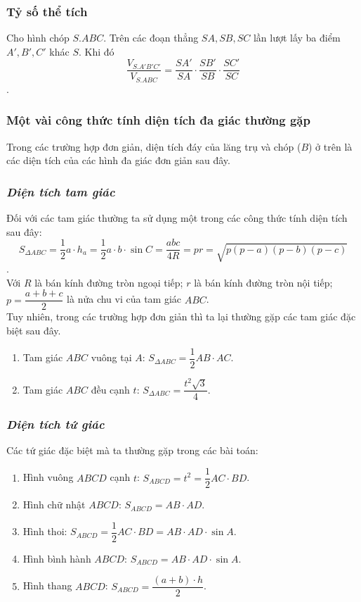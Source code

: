 \subsubsection{Tỷ số thể tích}
\begin{tc}
Cho hình chóp $S.ABC$. Trên các đoạn thẳng $SA, SB, SC$ lần lượt lấy ba điểm $A', B', C'$ khác $S$. Khi đó $$\dfrac{V_{S.A'B'C'}}{V_{S.ABC}}=\dfrac{SA'}{SA}\cdot\dfrac{SB'}{SB}\cdot\dfrac{SC'}{SC}$$.
\end{tc}
\subsubsection*{Một vài công thức tính diện tích đa giác thường gặp}
Trong các trường hợp đơn giản, diện tích đáy của lăng trụ và chóp ($B$) ở trên là các diện tích của các hình đa giác đơn giản sau đây.
\subsubsection*{\it Diện tích tam giác}
Đối với các tam giác thường ta sử dụng một trong các công thức tính diện tích sau đây:\\
$$S_{\Delta ABC} = \dfrac{1}{2} a\cdot h_a= \dfrac{1}{2}a\cdot b\cdot \sin C = \dfrac{abc}{4R}=pr = \sqrt{p(p-a)(p-b)(p-c)}$$.\\
Với $R$ là bán kính đường tròn ngoại tiếp; $r$ là bán kính đường tròn nội tiếp; $p= \dfrac{a+b+c}{2}$ là nửa chu vi của tam giác $ABC$.\\
Tuy nhiên, trong các trường hợp đơn giản thì ta lại thường gặp các tam giác đặc biệt sau đây.
\begin{enumerate}
\item Tam giác $ABC$ vuông tại $A$: $S_{\Delta ABC}=\dfrac{1}{2}AB\cdot AC$.
\item Tam giác $ABC$ đều cạnh $t$: $S_{\Delta ABC}=\dfrac{t^2 \sqrt{3}}{4}$.
\end{enumerate}

\subsubsection*{\it Diện tích tứ giác}
Các tứ giác đặc biệt mà ta thường gặp trong các bài toán:
\begin{enumerate}
\item Hình vuông $ABCD$ cạnh $t$: $S_{ABCD}=t^2 = \dfrac{1}{2}AC\cdot BD$.

\item Hình chữ nhật $ABCD$: $S_{ABCD}=AB\cdot AD$.

\item Hình thoi: $S_{ABCD}=\dfrac{1}{2}AC\cdot BD = AB\cdot AD\cdot \sin A$.\\

\item Hình bình hành $ABCD$: $S_{ABCD}=AB\cdot  AD\cdot\sin A.$

	
\item Hình thang $ABCD$: $S_{ABCD}=\dfrac{(a+b)\cdot h}{2}$.
\end{enumerate}
